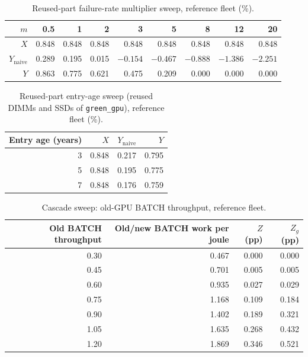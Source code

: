 \documentclass{article} %
\begin{document}
\begin{table}[h]
\caption{Reused-part failure-rate multiplier sweep, reference fleet (\%).}
\label{tab:mult_app}
\begin{center}
\small
\begin{tabular}{rrrrrrrrr}
\toprule
$m$ & 0.5 & 1 & 2 & 3 & 5 & 8 & 12 & 20 \\
\midrule
$X$ & 0.848 & 0.848 & 0.848 & 0.848 & 0.848 & 0.848 & 0.848 & 0.848 \\
$Y_{\text{naive}}$ & 0.289 & 0.195 & 0.015 & $-0.154$ & $-0.467$ & $-0.888$ & $-1.386$ & $-2.251$ \\
$Y$ & 0.863 & 0.775 & 0.621 & 0.475 & 0.209 & 0.000 & 0.000 & 0.000 \\
\bottomrule
\end{tabular}
\end{center}
\end{table}

\begin{table}[h]
\caption{Reused-part entry-age sweep (reused DIMMs and SSDs of \texttt{green\_gpu}), reference fleet (\%).}
\label{tab:entry_app}
\begin{center}
\small
\begin{tabular}{rrrr}
\toprule
Entry age (years) & $X$ & $Y_{\text{naive}}$ & $Y$ \\
\midrule
3 & 0.848 & 0.217 & 0.795 \\
5 & 0.848 & 0.195 & 0.775 \\
7 & 0.848 & 0.176 & 0.759 \\
\bottomrule
\end{tabular}
\end{center}
\end{table}

\begin{table}[h]
\caption{Cascade sweep: old-GPU BATCH throughput, reference fleet.}
\label{tab:cascade_app}
\begin{center}
\small
\begin{tabular}{rrrr}
\toprule
Old BATCH throughput & Old/new BATCH work per joule & $Z$ (pp) & $Z_g$ (pp) \\
\midrule
0.30 & 0.467 & 0.000 & 0.000 \\
0.45 & 0.701 & 0.005 & 0.005 \\
0.60 & 0.935 & 0.027 & 0.029 \\
0.75 & 1.168 & 0.109 & 0.184 \\
0.90 & 1.402 & 0.189 & 0.321 \\
1.05 & 1.635 & 0.268 & 0.432 \\
1.20 & 1.869 & 0.346 & 0.521 \\
\bottomrule
\end{tabular}
\end{center}
\end{table}
\end{document}

